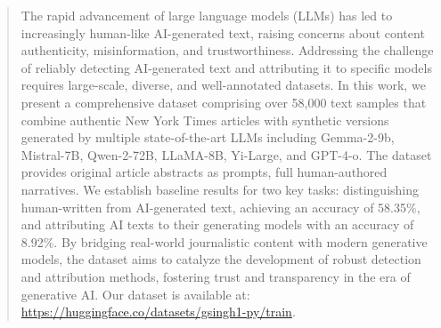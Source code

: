 \begin{abstract}
The rapid advancement of large language models (LLMs) has led to increasingly human-like AI-generated text, raising concerns about content authenticity, misinformation, and trustworthiness. Addressing the challenge of reliably detecting AI-generated text and attributing it to specific models requires large-scale, diverse, and well-annotated datasets. In this work, we present a comprehensive dataset comprising over 58,000 text samples that combine authentic New York Times articles with synthetic versions generated by multiple state-of-the-art LLMs including Gemma-2-9b, Mistral-7B, Qwen-2-72B, LLaMA-8B, Yi-Large, and GPT-4-o. The dataset provides original article abstracts as prompts, full human-authored narratives. We establish baseline results for two key tasks: distinguishing human-written from AI-generated text, achieving an accuracy of 58.35\%, and attributing AI texts to their generating models with an accuracy of 8.92\%. By bridging real-world journalistic content with modern generative models, the dataset aims to catalyze the development of robust detection and attribution methods, fostering trust and transparency in the era of generative AI. Our dataset is available at: \href{https://huggingface.co/datasets/gsingh1-py/train}{https://huggingface.co/datasets/gsingh1-py/train}.
\end{abstract}
